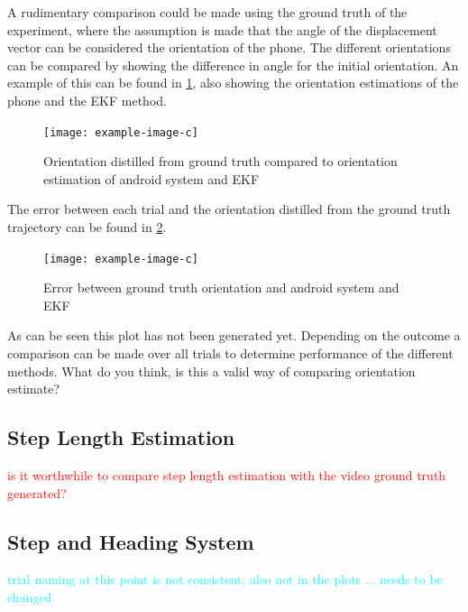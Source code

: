 A rudimentary comparison could be made using the ground truth of the experiment, where the assumption is made that the angle of the displacement vector can be considered the orientation of the phone. The different orientations can be compared by showing the difference in angle for the initial orientation. An example of this can be found in \cref{fig:orientation_comparison}, also showing the orientation estimations of the phone and the EKF method.

\begin{figure}[H]
	\centering
	\texttt{[image: example-image-c]}
	\caption{Orientation distilled from ground truth compared to orientation estimation of android system and EKF}
	\label{fig:orientation_comparison}
\end{figure}

The error between each trial and the orientation distilled from the ground truth trajectory can be found in \cref{fig:orientation_error_comparison}.

\begin{figure}[H]
	\centering
	\texttt{[image: example-image-c]}
	\caption{Error between ground truth orientation and android system and EKF}
	\label{fig:orientation_error_comparison}
\end{figure}


{\color{red}As can be seen this plot has not been generated yet. Depending on the outcome a comparison can be made over all trials to determine performance of the different methods. What do you think, is this a valid way of comparing orientation estimate?}


\subsection{Step Length Estimation}

\textcolor{red}{is it worthwhile to compare step length estimation with the video ground truth generated?}

\subsection{Step and Heading System}

\textcolor{cyan}{trial naming at this point is not consistent, also not in the plots ... needs to be changed}

